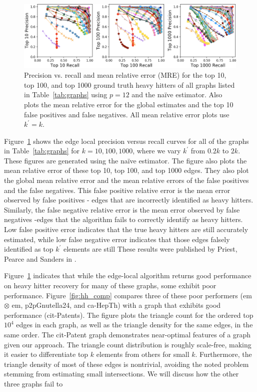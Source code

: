\documentclass[10]{article}
\begin{document}
\begin{figure}
	\centerline{\includegraphics[width=1.0\columnwidth]{graph_challenge_plot}}
	\caption{Precision vs. recall and mean relative error (MRE) for the top 10, top 100, and top 1000 ground truth heavy hitters of all graphs listed in Table~\ref{tab:graphs} using $p=12$ and the na\"ive estimator.
	Also plots the mean relative error for the global estimates and the top 10 false positives and false negatives.
	All mean relative error plots use $k^\prime = k$.
	\label{fig:graph_challenge}}
\end{figure}

Figure~\ref{fig:graph_challenge} shows the edge local precision versus recall curves for all of the graphs in Table~\ref{tab:graphs} for $k = 10, 100, 1000$, where we vary $k^\prime$ from $0.2k$ to $2k$. 
These figures are generated using the na\"ive estimator.
The figure also plots the mean relative error of these top 10, top 100, and top 1000 edges.
They also plot the global mean relative error and the mean relative errors of the false positives and the false negatives.
This false positive relative error is the mean error observed by false positives - edges that are incorrectly identified as heavy hitters.
Similarly, the false negative relative error is the mean error observed by false negatives -edges that the algorithm fails to correctly identify as heavy hitters. 
Low false positive error indicates that the true heavy hitters are still accurately estimated, while low false negative error indicates that those edges falsely identified as top $k^\prime$ elements are still
These results were published by Priest, Pearce and Sanders in \cite{priest2018estimating}.



Figure~\ref{fig:graph_challenge} indicates that while the edge-local algorithm returns good performance on heavy hitter recovery for many of these graphs, some exhibit poor performance.
Figure~\ref{fig:hh_comp} compares three of these poor performers (em $\otimes$ em, p2pGnutella24, and ca-HepTh) with a graph that exhibits good performance (cit-Patents).
The figure plots the triangle count for the ordered top $10^4$ edges in each graph, as well as the triangle density for the same edges, in the same order.
The cit-Patent graph demonstrates near-optimal features of a graph given our approach.
The triangle count distribution is roughly scale-free, making it easier to differentiate top $k$ elements from others for small $k$. 
Furthermore, the triangle density of most of these edges is nontrivial, avoiding the noted problem stemming from estimating small intersections. 
We will discuss how the other three graphs fail to 
\end{document}
